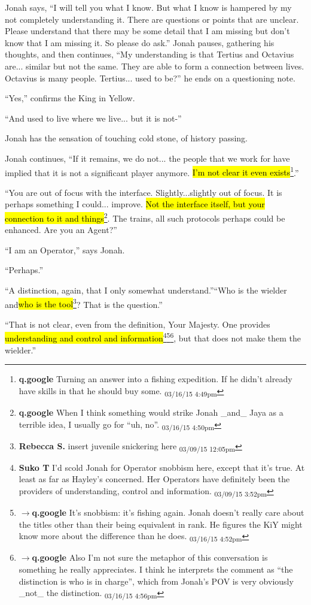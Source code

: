 Jonah says, ``I will tell you what I know.  But what I know is hampered by my not completely understanding it.  There are questions or points that are unclear.  Please understand that there may be some detail that I am missing but don't know that I am missing it.  So please do ask.''  Jonah pauses, gathering his thoughts, and then continues, ``My understanding is that Tertius and Octavius are... similar but not the same.  They are able to form a connection between lives.  Octavius is many people.  Tertius... used to be?'' he ends on a questioning note.

``Yes,'' confirms the King in Yellow.

``And used to live where we live... but it is not-''

Jonah has the sensation of touching cold stone, of history passing.

Jonah continues, ``If it remains, we do not... the people that we work for have implied that it is not a significant player anymore.  \hl{I'm not clear it even exists}\footnote{\textbf{q.google }Turning an answer into a fishing expedition.  If he didn't already have skills in that he should buy some. \textsubscript{03/16/15 4:49pm}}.''

``You are out of focus with the interface.  Slightly...slightly out of focus.  It is perhaps something I could... improve.  \hl{Not the interface itself, but your connection to it and things}\footnote{\textbf{q.google }When I think something would strike Jonah \_and\_ Jaya as a terrible idea, I usually go for ``uh, no''. \textsubscript{03/16/15 4:50pm}}.  The trains, all such protocols perhaps could be enhanced.  Are you an Agent?''

``I am an Operator,'' says Jonah.

``Perhaps.''

``A distinction, again, that I only somewhat understand.''``Who is the wielder and\hl{who is the tool}\footnote{\textbf{Rebecca S. }insert juvenile snickering here \textsubscript{03/09/15 12:05pm}}?  That is the question.''

``That is not clear, even from the definition, Your Majesty.  One provides \hl{understanding and control and information}\footnote{\textbf{Suko T }I'd scold Jonah for Operator snobbism here, except that it's true.   At least as far as Hayley's concerned.  Her Operators have definitely been the providers of understanding, control and information. \textsubscript{03/09/15 3:52pm}}\footnote{$\rightarrow$\textbf{q.google }It's snobbism: it's fishing again.  Jonah doesn't really care about the titles other than their being equivalent in rank.  He figures the KiY might know more about the difference than he does. \textsubscript{03/16/15 4:52pm}}\footnote{$\rightarrow$\textbf{q.google }Also I'm not sure the metaphor of this conversation is something he really appreciates.  I think he interprets the comment as ``the distinction is who is in charge'', which from Jonah's POV is very obviously \_not\_ the distinction. \textsubscript{03/16/15 4:56pm}}, but that does not make them the wielder.''

